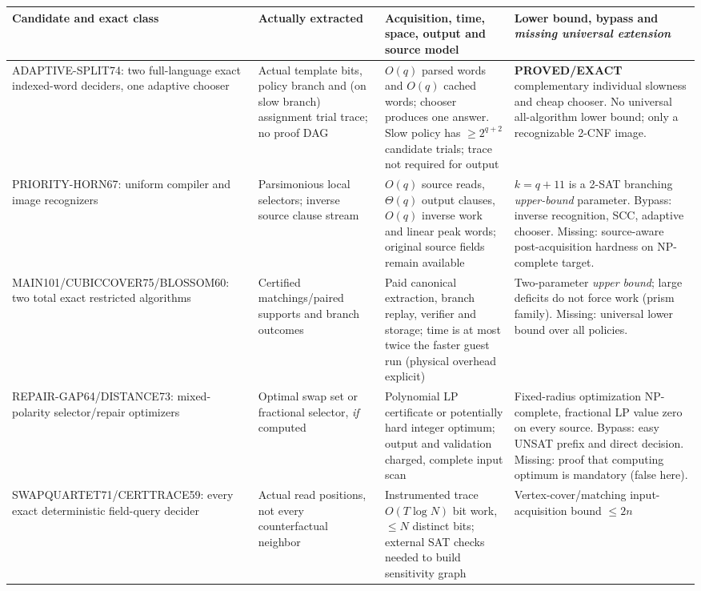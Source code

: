 \documentclass[11pt]{article}
\begin{document}
\begin{longtable}{p{.155\linewidth}p{.175\linewidth}p{.255\linewidth}p{.29\linewidth}}
\toprule
Candidate and exact class & Actually extracted & Acquisition, time, space, output and source model &
Lower bound, bypass and \emph{missing universal extension}\\
\midrule\endhead
ADAPTIVE-SPLIT74: two full-language exact indexed-word deciders,
one adaptive chooser &
Actual template bits, policy branch and (on slow branch) assignment
trial trace; no proof DAG &
$O(q)$ parsed words and $O(q)$ cached words; chooser produces one answer.
Slow policy has $\ge2^{q+2}$ candidate trials; trace not required for output &
\textbf{PROVED/EXACT} complementary individual slowness and cheap chooser.
No universal all-algorithm lower bound; only a recognizable 2-CNF image.\\
\midrule
PRIORITY-HORN67: uniform compiler and image recognizers &
Parsimonious local selectors; inverse source clause stream &
$O(q)$ source reads, $\Theta(q)$ output clauses, $O(q)$ inverse work
and linear peak words; original source fields remain available &
$k=q+11$ is a 2-SAT branching \emph{upper-bound} parameter.
Bypass: inverse recognition, SCC, adaptive chooser. Missing: source-aware
post-acquisition hardness on NP-complete target.\\
\midrule
MAIN101/CUBICCOVER75/BLOSSOM60: two total exact restricted algorithms &
Certified matchings/paired supports and branch outcomes &
Paid canonical extraction, branch replay, verifier and storage;
time is at most twice the faster guest run (physical overhead explicit) &
Two-parameter \emph{upper bound}; large deficits do not force work
(prism family). Missing: universal lower bound over all policies.\\
\midrule
REPAIR-GAP64/DISTANCE73: mixed-polarity selector/repair optimizers &
Optimal swap set or fractional selector, \emph{if} computed &
Polynomial LP certificate or potentially hard integer optimum;
output and validation charged, complete input scan &
Fixed-radius optimization NP-complete, fractional LP value zero
on every source. Bypass: easy UNSAT prefix and direct decision.
Missing: proof that computing optimum is mandatory (false here).\\
\midrule
SWAPQUARTET71/CERTTRACE59: every exact deterministic field-query
decider &
Actual read positions, not every counterfactual neighbor &
Instrumented trace $O(T\log N)$ bit work, $\le N$ distinct bits;
external SAT checks needed to build sensitivity graph &
Vertex-cover/matching input-acquisition bound $\le2n$

\end{longtable}
\end{document}

